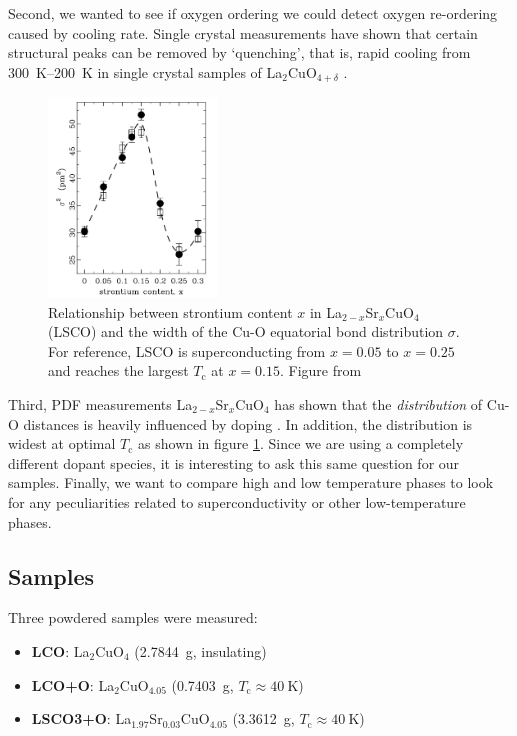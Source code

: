Second, we wanted to see if oxygen ordering we could detect oxygen re-ordering caused by cooling rate. Single crystal measurements have shown that certain structural peaks can be removed by `quenching', that is, rapid cooling from \SIrange{300}{200}{\kelvin} in single crystal samples of La$_2$CuO$_{4+\delta}$ \cite{Poccia2012}.

\begin{figure}
    \centering
    \includegraphics[width=0.4\textwidth]{fig/pdf/bozin_cuo.png}
    \caption{Relationship between strontium content $x$ in La$_{2-x}$Sr$_x$CuO$_4$ (LSCO) and the width of the Cu-O equatorial bond distribution $\sigma$. For reference, LSCO is superconducting from $x=0.05$ to $x=0.25$ and reaches the largest $T_\text{c}$ at $x=0.15$. Figure from \cite{Bozin2000}}
    \label{fig:bozin_cuo}
\end{figure}

Third, PDF measurements La$_{2-x}$Sr$_x$CuO$_4$ has shown that the \emph{distribution} of Cu-O distances is heavily influenced by doping \cite{Bozin2000}. In addition, the distribution is widest at optimal $T_\text{c}$ as shown in figure \ref{fig:bozin_cuo}. Since we are using a completely different dopant species, it is interesting to ask this same question for our samples. Finally, we want to compare high and low temperature phases to look for any peculiarities related to superconductivity or other low-temperature phases.

\subsection{Samples}
Three powdered samples were measured:

\begin{itemize}
    \item \textbf{LCO}: La$_2$CuO$_4$ (\SI{2.7844}{\gram}, insulating)
    \item \textbf{LCO+O}: La$_2$CuO$_{4.05}$ (\SI{0.7403}{\gram}, $T_\text{c} \approx \SI{40}{\kelvin}$)
    \item \textbf{LSCO3+O}: La$_{1.97}$Sr$_{0.03}$CuO$_{4.05}$ (\SI{3.3612}{\gram}, $T_\text{c} \approx \SI{40}{\kelvin}$)
\end{itemize}

